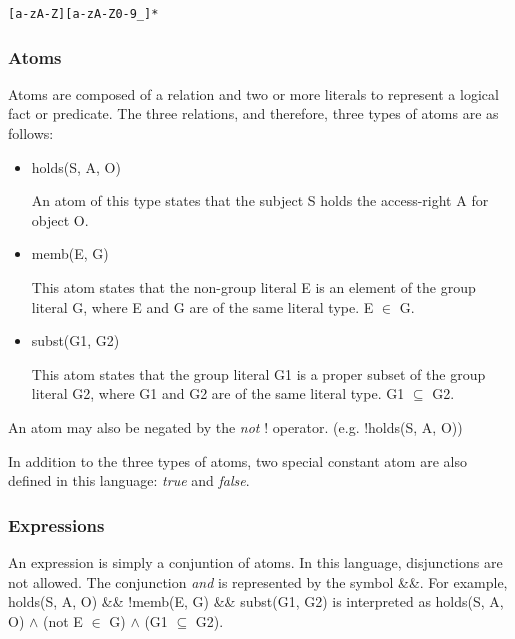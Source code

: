 \documentclass[a4paper]{article}
\begin{document}
\begin{verbatim}
[a-zA-Z][a-zA-Z0-9_]*
\end{verbatim}

      \subsubsection{Atoms}

        Atoms are composed of a relation and two or more literals to represent
        a logical fact or predicate. The three relations, and therefore, three
        types of atoms are as follows:

        \begin{itemize}

          \item holds(S, A, O)

            An atom of this type states that the subject S holds the
            access-right A for object O.

          \item memb(E, G)

          This atom states that the non-group literal E is an element of the
          group literal G, where E and G are of the same literal type.
          E $\in$ G.

          \item subst(G1, G2)

          This atom states that the group literal G1 is a proper subset of the
          group literal G2, where G1 and G2 are of the same literal type.
          G1 $\subseteq$ G2.

        \end{itemize}

        An atom may also be negated by the \emph{not} ! operator. (e.g.
        !holds(S, A, O))

        In addition to the three types of atoms, two special constant atom are
        also defined in this language: \emph{true} and \emph{false}.

      \subsubsection{Expressions}

        An expression is simply a conjuntion of atoms. In this language,
        disjunctions are not allowed. The conjunction \emph{and} is 
        represented by the symbol \&\&. For example, holds(S, A, O) \&\& 
        !memb(E, G) \&\& subst(G1, G2) is interpreted as holds(S, A, O) $\land$
        (not E $\in$ G) $\land$ (G1 $\subseteq$ G2).
\end{document}
